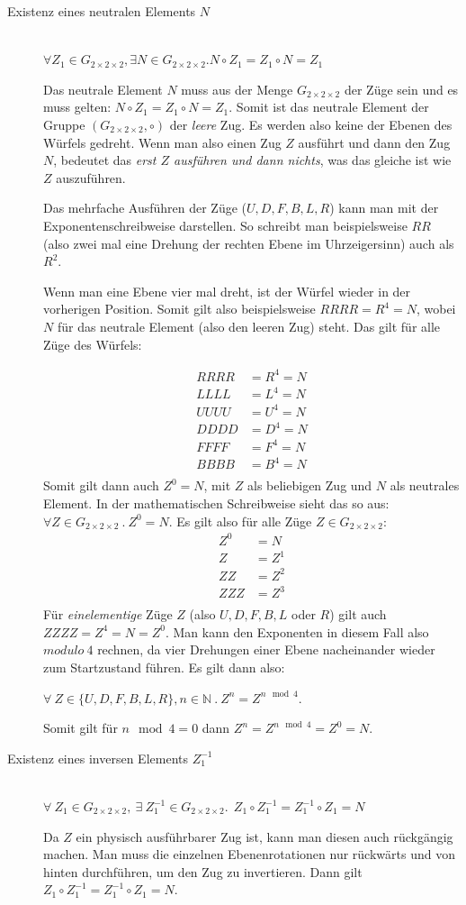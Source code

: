 \documentclass[12pt,a4paper, usenames, dvipsnames]{article}
\newcommand{\Gtwo}{\ensuremath{G_{2\times 2\times 2}}}
\begin{document}
\begin{description}
\item [Existenz eines neutralen Elements $N$] \ \\
$\forall Z_1 \in \Gtwo, \exists N \in \Gtwo.N \circ Z_1 = Z_1 \circ N = Z_1$ 


Das neutrale Element $N$ muss aus der Menge $\Gtwo$ der Züge sein und es muss gelten: $N \circ Z_1 = Z_1 \circ N = Z_1$. Somit ist das neutrale Element der Gruppe $(\Gtwo, \circ)$ der \textit{leere} Zug. Es werden also keine der Ebenen des Würfels gedreht. Wenn man also einen Zug $Z$ ausführt und dann den Zug $N$, bedeutet das \textit{erst $Z$ ausführen und dann nichts}, was das gleiche ist wie $Z$ auszuführen.

Das mehrfache Ausführen der Züge ($U, D, F, B, L, R$) kann man mit der Exponentenschreibweise darstellen. So schreibt man beispielsweise $RR$ (also zwei mal eine Drehung der rechten Ebene im Uhrzeigersinn) auch als $R^2$.

Wenn man eine Ebene vier mal dreht, ist der Würfel wieder in der vorherigen Position. Somit gilt also beispielsweise $RRRR=R^4=N$, wobei $N$ für das neutrale Element (also den leeren Zug) steht. Das gilt für alle Züge des Würfels:

\begin{align*}
RRRR & =R^4 =N \\
LLLL & =L^4 =N \\
UUUU & =U^4 =N \\
DDDD & =D^4 =N \\
FFFF & =F^4 =N \\
BBBB & =B^4 =N \\
\end{align*}
Somit gilt dann auch $Z^0=N$, mit $Z$ als beliebigen Zug und $N$ als neutrales Element. 
In der mathematischen Schreibweise sieht das so aus: $\forall Z \in \Gtwo \ . \ Z^0=N$. 
Es gilt also für alle Züge $Z \in \Gtwo$: 
\begin{align*}
Z^0 & =N \\
Z & =Z^1 \\
ZZ & =Z^2 \\
ZZZ & =Z^3 \\
\end{align*}
Für \textit{einelementige} Züge $Z$ (also $U, D, F, B, L$ oder $R$) gilt auch $ZZZZ =Z^4=N=Z^0$.
Man kann den Exponenten in diesem Fall also $modulo \ 4$ rechnen, da vier Drehungen einer Ebene nacheinander wieder zum Startzustand führen. 
Es gilt dann also:

$\forall \  Z \in \{U, D, F, B, L, R\}, n \in \mathbb{N} \ . \ Z^n=Z^{n \mod 4}$.

Somit gilt für $n \mod 4 = 0$ dann $Z^n = Z^{n \mod 4} = Z^0 = N$.


\item [Existenz eines inversen Elements $Z_1^{-1}$] \ \\
$\forall \  Z_1 \in \Gtwo,\ \exists \  Z_1^{-1} \in \Gtwo.  \ \ Z_1 \circ Z_1^{-1} = Z_1^{-1} \circ Z_1 = N$  


Da $Z$ ein physisch ausführbarer Zug ist, kann man diesen auch rückgängig machen. Man muss die einzelnen Ebenenrotationen nur rückwärts und von hinten durchführen, um den Zug zu invertieren. Dann gilt $Z_1 \circ Z_1^{-1} = Z_1^{-1} \circ Z_1 = N$.
\end{description}
\end{document}
